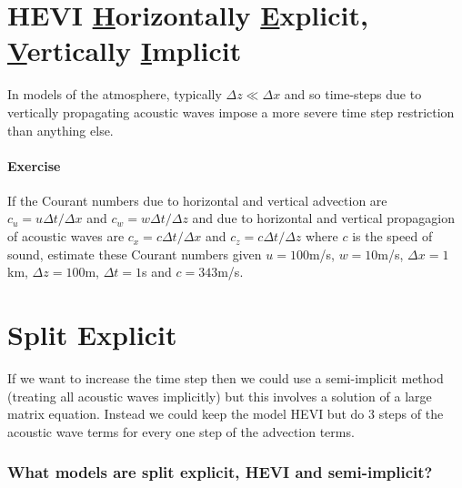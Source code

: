 \clearpage{}

\section{HEVI \textendash{}\uline{ H}orizontally \uline{E}xplicit, \uline{V}ertically
\uline{I}mplicit}

In models of the atmosphere, typically $\Delta z\ll\Delta x$ and
so time-steps due to vertically propagating acoustic waves impose
a more severe time step restriction than anything else. 

\paragraph*{Exercise}

If the Courant numbers due to horizontal and vertical advection are
$c_{u}=u\Delta t/\Delta x$ and $c_{w}=w\Delta t/\Delta z$ and due
to horizontal and vertical propagagion of acoustic waves are $c_{x}=c\Delta t/\Delta x$
and $c_{z}=c\Delta t/\Delta z$ where $c$ is the speed of sound,
estimate these Courant numbers given $u=100$m/s, $w=10$m/s, $\Delta x=1$km,
$\Delta z=100$m, $\Delta t=1$s and $c=343$m/s. 


\clearpage{}

\section{Split Explicit}

If we want to increase the time step then we could use a semi-implicit
method (treating all acoustic waves implicitly) but this involves
a solution of a large matrix equation. Instead we could keep the model
HEVI but do 3 steps of the acoustic wave terms for every one step
of the advection terms. 

\subsubsection*{What models are split explicit, HEVI and semi-implicit?}

